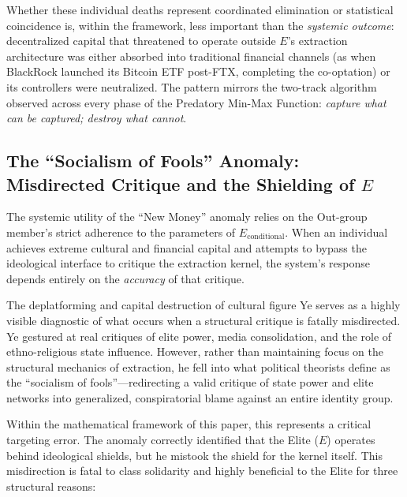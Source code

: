 \documentclass[12pt,openany]{book}
\begin{document}
Whether these individual deaths represent coordinated elimination or statistical coincidence is, within the framework, less important than the \textit{systemic outcome}: decentralized capital that threatened to operate outside $E$'s extraction architecture was either absorbed into traditional financial channels (as when BlackRock launched its Bitcoin ETF post-FTX, completing the co-optation) or its controllers were neutralized. The pattern mirrors the two-track algorithm observed across every phase of the Predatory Min-Max Function: \textit{capture what can be captured; destroy what cannot}.

\subsection{The ``Socialism of Fools'' Anomaly: Misdirected Critique and the Shielding of $E$}

The systemic utility of the ``New Money'' anomaly relies on the Out-group member's strict adherence to the parameters of $E_{\text{conditional}}$. When an individual achieves extreme cultural and financial capital and attempts to bypass the ideological interface to critique the extraction kernel, the system's response depends entirely on the \textit{accuracy} of that critique.

The deplatforming and capital destruction of cultural figure Ye serves as a highly visible diagnostic of what occurs when a structural critique is fatally misdirected. Ye gestured at real critiques of elite power, media consolidation, and the role of ethno-religious state influence. However, rather than maintaining focus on the structural mechanics of extraction, he fell into what political theorists define as the ``socialism of fools''---redirecting a valid critique of state power and elite networks into generalized, conspiratorial blame against an entire identity group.

Within the mathematical framework of this paper, this represents a critical targeting error. The anomaly correctly identified that the Elite ($E$) operates behind ideological shields, but he mistook the shield for the kernel itself. This misdirection is fatal to class solidarity and highly beneficial to the Elite for three structural reasons:
\end{document}
